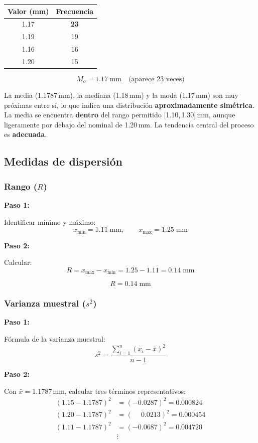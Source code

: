 \documentclass[12pt,letterpaper]{article}
\newcommand{\resultado}[2][Resultado]{%
  \begin{tcolorbox}[resultadoStyle, title={#1}]#2\end{tcolorbox}}
\newcommand{\interpretacion}[2][Interpretaci\'on]{%
  \begin{tcolorbox}[interpretacionStyle, title={#1}]#2\end{tcolorbox}}
\newcommand{\paso}[1]{%
  \vspace{4pt}%
  \begin{tcolorbox}[pasoStyle]%
    \textbf{\color{azulprin}Paso #1:}%
  \end{tcolorbox}%
  \vspace{2pt}}
\newcommand{\formula}[1]{\vspace{2pt}\[ #1 \]\vspace{-4pt}}
\begin{document}
\begin{center}
\begin{tabular}{cc}
\toprule
\rowcolor{azulclaro}
\textbf{Valor (mm)} & \textbf{Frecuencia} \\
\midrule
1.17 & \textbf{23} \\
\rowcolor{grisclaro} 1.19 & 19 \\
1.16 & 16 \\
\rowcolor{grisclaro} 1.20 & 15 \\
\bottomrule
\end{tabular}
\end{center}

\resultado[$M_o$ -- Moda]{\[ M_o = 1.17\;\text{mm} \quad \text{(aparece 23 veces)} \]}

\interpretacion[Tendencia central --- Problema 1]{
La media (1.1787\,mm), la mediana (1.18\,mm) y la moda (1.17\,mm) son muy
pr\'oximas entre s\'i, lo que indica una distribuci\'on \textbf{aproximadamente
sim\'etrica}. La media se encuentra \textbf{dentro} del rango permitido
[1.10,\,1.30]\,mm, aunque ligeramente por debajo del nominal de 1.20\,mm.
La tendencia central del proceso es \textbf{adecuada}.}

\subsection{Medidas de dispersi\'on}

\subsubsection*{Rango ($R$)}

\paso{1} Identificar m\'inimo y m\'aximo:
\formula{x_{\min} = 1.11\;\text{mm}, \qquad x_{\max} = 1.25\;\text{mm}}

\paso{2} Calcular:
\formula{R = x_{\max} - x_{\min} = 1.25 - 1.11 = 0.14\;\text{mm}}

\resultado[$R$ -- Rango]{\[ R = 0.14\;\text{mm} \]}

\subsubsection*{Varianza muestral ($s^2$)}

\paso{1} F\'ormula de la varianza muestral:
\formula{s^2 = \frac{\displaystyle\sum_{i=1}^{n}(x_i - \bar{x})^2}{n-1}}

\paso{2} Con $\bar{x} = 1.1787$\,mm, calcular tres t\'erminos representativos:
\begin{align*}
(1.15 - 1.1787)^2 &= (-0.0287)^2 = 0.000824 \\
(1.20 - 1.1787)^2 &= (\phantom{-}0.0213)^2 = 0.000454 \\
(1.11 - 1.1787)^2 &= (-0.0687)^2 = 0.004720 \\
&\vdots
\end{align*}
\end{document}
